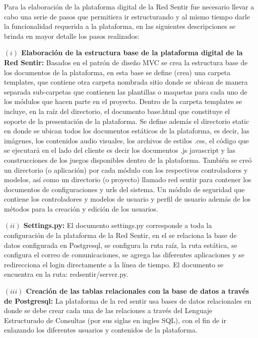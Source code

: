 \documentclass[journal,transmag]{IEEEtran}
\begin{document}
Para la elaboración de la plataforma digital de la Red Sentir fue necesario llevar a cabo una serie de pasos que permitiera ir estructurando y al mismo tiempo darle la funcionalidad requerida a la plataforma, en las siguientes descripciones se brinda en mayor detalle los pasos realizados:

\textbf{$(i)$ Elaboración de la estructura base de la plataforma digital de la Red Sentir:}  Basados en el patrón de diseño MVC se crea la estructura base de los documentos de la plataforma, en esta base se define (crea) una carpeta templates, que contiene otra carpeta nombrada sitio donde se ubican de manera separada sub-carpetas que contienen las plantillas o maquetas para cada uno de los módulos que hacen parte en el proyecto. Dentro de la carpeta templates se incluye, en la raíz del directorio, el documento base.html que constituye el soporte de la presentación de la plataforma. Se define además el directorio static en donde se ubican todos los documentos estáticos de la plataforma, es decir, las imágenes, los contenidos audio visuales, los archivos de estilos .css, el código que se ejecutará en el lado del cliente es decir los documentos .js javascript y las construcciones de los juegos disponibles dentro de la plataforma. También se creó un directorio (o aplicación) por cada módulo con los respectivos controladores y modelos, así como un directorio (o proyecto) llamado red sentir para contener los documentos de configuraciones y urls del sistema. Un módulo de seguridad que contiene los controladores y modelos de usuario y perfil de usuario además de los métodos para la creación y edición de los usuarios.

\textbf{$(ii)$ Settings.py:} El documento settings.py corresponde a toda la configuración de la plataforma de la Red Sentir, en el se relaciona la base de datos configurada en Postgresql, se configura la ruta raíz, la ruta estática, se configura el correo de comunicaciones, se agrega las diferentes aplicaciones y se redirecciona el login directamente a la línea de tiempo. El documento se encuentra en la ruta: redsentir/server.py.

\textbf{$(iii)$ Creación de las tablas relacionales con la base de datos a través de Postgresql:} La plataforma de la red sentir usa bases de datos relacionales en donde se debe crear cada una de las relaciones a través del Lenguaje Estructurado de Consultas (por sus siglas en ingles SQL), con el fin de ir enlazando los diferentes usuarios y contenidos de la plataforma.
\end{document}
